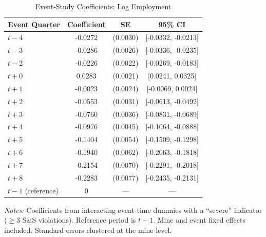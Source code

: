 \begin{table}[htbp]
\centering
\caption{Event-Study Coefficients: Log Employment}
\label{tab:event_study}
\begin{tabular}{lccc}
\toprule
Event Quarter & Coefficient & SE & 95\% CI \\
\midrule
$t-4$ & -0.0272 & (0.0030) & [-0.0332, -0.0213] \\
$t-3$ & -0.0286 & (0.0026) & [-0.0336, -0.0235] \\
$t-2$ & -0.0226 & (0.0022) & [-0.0269, -0.0183] \\
$t+0$ & 0.0283 & (0.0021) & [0.0241, 0.0325] \\
$t+1$ & -0.0023 & (0.0024) & [-0.0069, 0.0024] \\
$t+2$ & -0.0553 & (0.0031) & [-0.0613, -0.0492] \\
$t+3$ & -0.0760 & (0.0036) & [-0.0831, -0.0689] \\
$t+4$ & -0.0976 & (0.0045) & [-0.1064, -0.0888] \\
$t+5$ & -0.1404 & (0.0054) & [-0.1509, -0.1298] \\
$t+6$ & -0.1940 & (0.0062) & [-0.2063, -0.1818] \\
$t+7$ & -0.2154 & (0.0070) & [-0.2291, -0.2018] \\
$t+8$ & -0.2283 & (0.0077) & [-0.2435, -0.2131] \\
\midrule
$t-1$ (reference) & 0 & --- & --- \\
\bottomrule
\end{tabular}
\begin{tablenotes}[flushleft]\small
\item \textit{Notes:} Coefficients from interacting event-time dummies with a ``severe'' indicator ($\geq$3 S\&S violations). Reference period is $t-1$. Mine and event fixed effects included. Standard errors clustered at the mine level.
\end{tablenotes}
\end{table}

